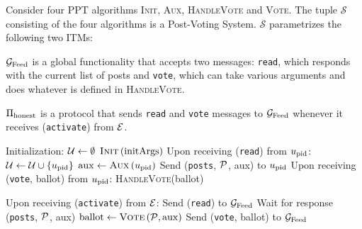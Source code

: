 \documentclass[a4paper,english,cleveref, autoref]{oasics-v2019}
\begin{document}
\begin{definition}
  \label{model:def:pvs}
  Consider four PPT algorithms \textsc{Init}, \textsc{Aux}, \textsc{HandleVote}
  and \textsc{Vote}. The tuple $\mathcal{S}$ consisting of the four algorithms
  is a Post-Voting System. $\mathcal{S}$ parametrizes the following two ITMs:

  $\mathcal{G}_{\mathrm{Feed}}$ is a global functionality that accepts two messages: \texttt{read},
  which responds with the current list of posts and \texttt{vote}, which can
  take various arguments and does whatever is defined in \textsc{HandleVote}.

  $\Pi_{\mathrm{honest}}$ is a protocol that sends \texttt{read} and \texttt{vote}
  messages to $\mathcal{G}_{\mathrm{Feed}}$ whenever it receives (\texttt{activate}) from $\mathcal{E}$.
\end{definition}
\begin{algorithm}[H]
  \caption{$\gfunc\left(\textsc{Init}, \textsc{Aux},
  \textsc{HandleVote}\right)\left(\postlist, \mathrm{initArgs}\right)$}
  \label{alg:gfunc}
  \begin{algorithmic}[1]
    \State Initialization:
    \Indent
      \State $\mathcal{U} \gets \emptyset$ 
      \State $\textsc{Init}\left(\mathrm{initArgs}\right)$
    \EndIndent
    \State
    \State Upon receiving (\texttt{read}) from $u_{\mathrm{pid}}$:
    \Indent
      \State $\mathcal{U} \gets \mathcal{U} \cup \left\{u_{\mathrm{pid}}\right\}$
      \State $\mathrm{aux} \gets \textsc{Aux}\left(u_{\mathrm{pid}}\right)$
      \State Send (\texttt{posts}, $\mathcal{P}$, aux) to $u_{\mathrm{pid}}$
    \EndIndent
    \State
    \State Upon receiving (\texttt{vote}, ballot) from
    $u_{\mathrm{pid}}$:
     \Indent
       \State \textsc{HandleVote}(ballot)
     \EndIndent
  \end{algorithmic}
\end{algorithm}
\begin{algorithm}[H]
  \caption{$\honeststr\left(\textsc{Vote}\right)$}
  \label{alg:honest}
  \begin{algorithmic}[1]
    \State Upon receiving (\texttt{activate}) from $\mathcal{E}$:
    \label{alg:honest:activate}
    \Indent
      \State Send (\texttt{read}) to $\mathcal{G}_{\mathrm{Feed}}$
      \State Wait for response (\texttt{posts}, $\mathcal{P}$, aux)
      \State $\mathrm{ballot} \gets \textsc{Vote}\left(\mathcal{P},
      \mathrm{aux}\right)$
      \State Send (\texttt{vote}, ballot) to $\mathcal{G}_{\mathrm{Feed}}$
    \EndIndent
  \end{algorithmic}
\end{algorithm}
\end{document}

